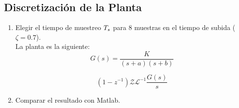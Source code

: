 \subsection{Discretización de la Planta}
\begin{enumerate}[label=2.\arabic*.]
	\item Elegir el tiempo de muestreo $T_s$ para 8 muestras en el tiempo de subida ($\zeta = 0.7$). \\
	La planta es la siguiente:
	\begin{equation}
		G(s) = \frac{K}{(s+a)(s+b)}
	\end{equation}
	
	\begin{equation}
		(1-z^{-1})\mathcal{Z}{\mathcal{L}^{-1}{\frac{G(s)}{s}}}
	\end{equation}
	
	
	\item Comparar el resultado con Matlab.
\end{enumerate}
